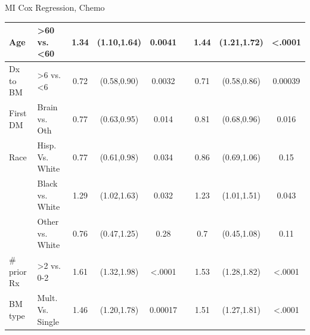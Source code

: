 \begin{frame}{MI Cox Regression, Chemo}
\begin{table}[]
{\begin{tabular}{|l|l|c|c|c|c|c|c|c|}
Age                            & \textgreater 60 vs. \textless 60 & 1.34                                                & (1.10,1.64)           & 0.0041                &                       & 1.44                  & (1.21,1.72) & \textless .0001                                             \\ \hline
Dx to BM                       & \textgreater 6 vs. \textless 6   & 0.72                                                & (0.58,0.90)           & 0.0032                &                       & 0.71                  & (0.58,0.86) & 0.00039                                                     \\ \hline
First DM                       & Brain vs. Oth                    & 0.77                                                & (0.63,0.95)           & 0.014                 &                       & 0.81                  & (0.68,0.96) & 0.016                                                       \\ \hline
Race                           & Hisp. Vs. White                  & 0.77                                                & (0.61,0.98)           & 0.034                 &                       & 0.86                  & (0.69,1.06) & 0.15                                                        \\ \hline
                               & Black vs. White                  & 1.29                                                & (1.02,1.63)           & 0.032                 &                       & 1.23                  & (1.01,1.51) & 0.043                                                       \\ \hline
                               & Other vs. White                  & 0.76                                                & (0.47,1.25)           & 0.28                  &                       & 0.7                   & (0.45,1.08) & 0.11                                                        \\ \hline
\# prior Rx                    & \textgreater2 vs. 0-2            & 1.61                                                & (1.32,1.98)           & \textless .0001       &                       & 1.53                  & (1.28,1.82) & \textless .0001                                             \\ \hline
BM type                        & Mult. Vs. Single                 & 1.46                                                & (1.20,1.78)           & 0.00017               &                       & 1.51                  & (1.27,1.81) & \textless .0001                                             \\ \hline

\end{tabular}}
\end{table}
\end{frame}
